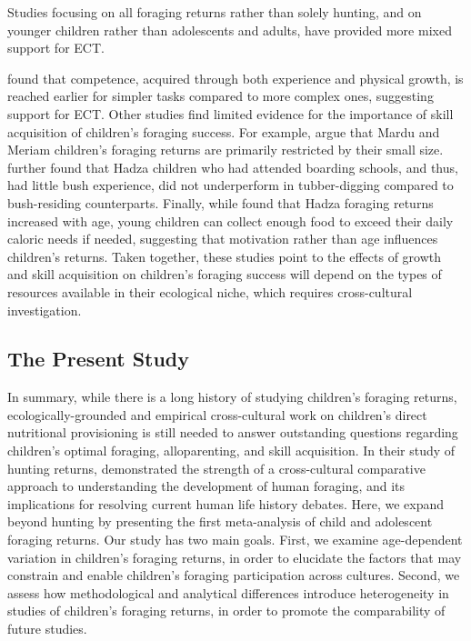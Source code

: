 Studies focusing on all foraging returns rather than solely hunting, and on younger children rather than adolescents and adults, have provided more mixed support for ECT.

\cite{bock_learning_2002} found that competence, acquired through both experience and physical growth, is reached earlier for simpler tasks compared to more complex ones, suggesting support for ECT. Other studies find limited evidence for the importance of skill acquisition of children’s foraging success. 
For example, \cite{ bird_constraints_2002, bird_children_2002, bird_mardu_2005} argue that Mardu and Meriam children’s foraging returns are primarily restricted by their small size.
\cite{blurton_jones_selection_2002} further found that Hadza children who had attended boarding schools, and thus, had little bush experience, did not underperform in tubber-digging compared to bush-residing counterparts. Finally, while \cite{crittenden_juvenile_2013} found that Hadza foraging returns increased with age, young children can collect enough food to exceed their daily caloric needs if needed, suggesting that motivation rather than age influences children’s returns. Taken together, these studies point to the effects of growth and skill acquisition on children’s foraging success will depend on the types of resources available in their ecological niche, which requires cross-cultural investigation. 

\subsection{The Present Study}
In summary, while there is a long history of studying children’s foraging returns, ecologically-grounded and empirical cross-cultural work on children’s direct nutritional provisioning is still needed to answer outstanding questions regarding children’s optimal foraging, alloparenting, and skill acquisition. In their study of hunting returns, \cite{koster_life_2020} demonstrated the strength of a cross-cultural comparative approach to understanding the development of human foraging, and its implications for resolving current human life history debates. Here, we expand beyond hunting by presenting the first meta-analysis of child and adolescent foraging returns. Our study has two main goals. First, we examine age-dependent variation in children’s foraging returns, in order to elucidate the factors that may constrain and enable children’s foraging participation across cultures. Second, we assess how methodological and analytical differences introduce heterogeneity in studies of children’s foraging returns, in order to promote the comparability of future studies.  
